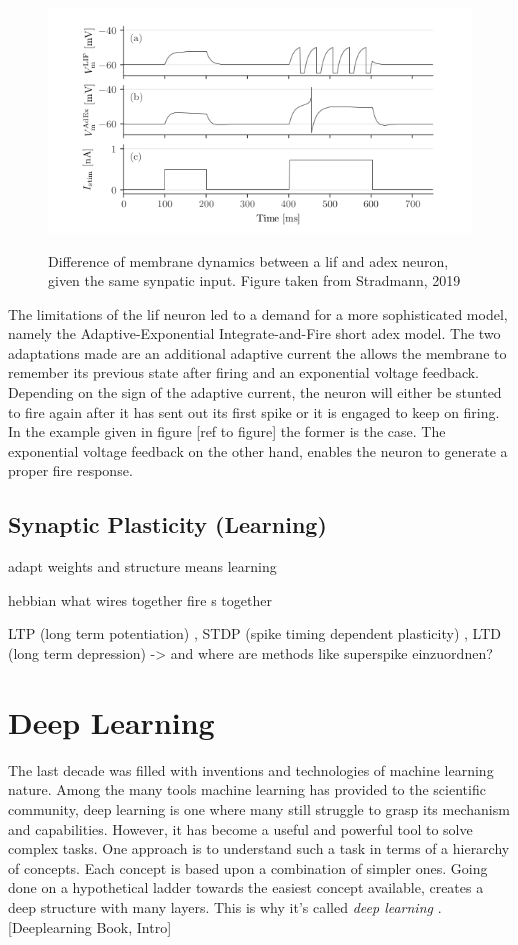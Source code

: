 \begin{figure}
	\includegraphics[width=\linewidth]{figures/LIFvsAdEx.png}
	\label{lifvsadex}
	\caption{Difference of membrane dynamics between a \gls{lif} and \gls{adex} neuron, given the same synpatic input. Figure taken from Stradmann, 2019}
\end{figure}

The limitations of the \gls{lif} neuron led to a demand for a more sophisticated model, namely the Adaptive-Exponential Integrate-and-Fire short \gls{adex} model. The two adaptations made are an additional adaptive current the allows the membrane to remember its previous state after firing and an exponential voltage feedback. Depending on the sign of the adaptive current, the neuron will either be stunted to fire again after it has sent out its first spike or it is engaged to keep on firing. In the example given in figure [ref to figure] the former is the case. The exponential voltage feedback on the other hand, enables the neuron to generate a proper fire response.\\

\subsection{Synaptic Plasticity (Learning)}
adapt weights and structure means learning

hebbian what wires together fire s together

LTP (long term potentiation) , STDP (spike timing dependent plasticity) , LTD (long term depression) -> and where are methods like superspike einzuordnen?




\section{Deep Learning}
\label{deeplearning}
The last decade was filled with inventions and technologies of machine learning nature. Among the many tools machine learning has provided to the scientific community, deep learning is one where many still struggle to grasp its mechanism and capabilities. However, it has become a useful and powerful tool to solve complex tasks. One approach is to understand such a task in terms of a hierarchy of concepts. Each concept is based upon a combination of simpler ones. Going done on a hypothetical ladder towards the easiest concept available, creates a deep structure with many layers. This is why it's called \textit{deep learning} . [Deeplearning Book, Intro]

